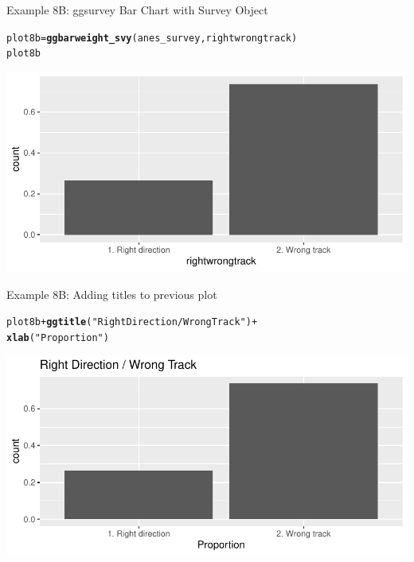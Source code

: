 \documentclass{beamer}\usepackage[]{graphicx}\usepackage[]{color}
\makeatletter
\newcommand{\hlstr}[1]{\textcolor[rgb]{0.192,0.494,0.8}{#1}}%
\newcommand{\hlopt}[1]{\textcolor[rgb]{0,0,0}{#1}}%
\newcommand{\hlstd}[1]{\textcolor[rgb]{0.345,0.345,0.345}{#1}}%
\newcommand{\hlkwb}[1]{\textcolor[rgb]{0.69,0.353,0.396}{#1}}%
\newcommand{\hlkwd}[1]{\textcolor[rgb]{0.737,0.353,0.396}{\textbf{#1}}}%
\newenvironment{kframe}{%
 \def\at@end@of@kframe{}%
 \ifinner\ifhmode%
  \def\at@end@of@kframe{\end{minipage}}%
  \begin{minipage}{\columnwidth}%
 \fi\fi%
 \def\FrameCommand##1{\hskip\@totalleftmargin \hskip-\fboxsep
 \colorbox{shadecolor}{##1}\hskip-\fboxsep
     \hskip-\linewidth \hskip-\@totalleftmargin \hskip\columnwidth}%
 \MakeFramed {\advance\hsize-\width
   \@totalleftmargin\z@ \linewidth\hsize
   \@setminipage}}%
 {\par\unskip\endMakeFramed%
 \at@end@of@kframe}
\newenvironment{knitrout}{}{} %
\makeatother
\begin{document}
\begin{frame}[fragile]{Example 8B: ggsurvey Bar Chart with Survey Object }
\begin{knitrout}
\color{fgcolor}\begin{kframe}
\begin{alltt}
\hlstd{plot8b} \hlkwb{=} \hlkwd{ggbarweight_svy}\hlstd{(anes_survey, rightwrongtrack)}
\hlstd{plot8b}
\end{alltt}
\end{kframe}
\includegraphics[width=0.95\linewidth]{figure/unnamed-chunk-33-1} 
\end{knitrout}
\end{frame}
\begin{frame}[fragile]{Example 8B: Adding titles to previous plot}

\begin{knitrout}
\color{fgcolor}\begin{kframe}
\begin{alltt}
\hlstd{plot8b} \hlopt{+} \hlkwd{ggtitle}\hlstd{(}\hlstr{"Right Direction / Wrong Track"}\hlstd{)} \hlopt{+}
    \hlkwd{xlab}\hlstd{(}\hlstr{"Proportion"}\hlstd{)}
\end{alltt}
\end{kframe}
\includegraphics[width=0.95\linewidth]{figure/unnamed-chunk-34-1} 
\end{knitrout}

\end{frame}
\end{document}
